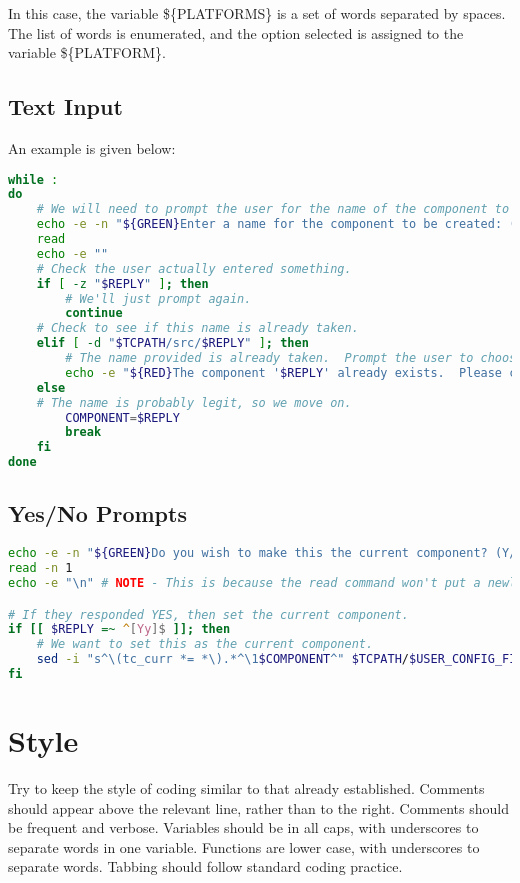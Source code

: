 \documentclass[a4paper, oneside, 11pt, titlepage, onecolumn, openright]{report}
\begin{document}
In this case, the variable \$\{PLATFORMS\} is a set of words separated by spaces. The list of words is enumerated, and the option selected is assigned to the variable \$\{PLATFORM\}. 

\subsection{Text Input}
			\label{ss:TextInput}
			An example is given below:

\begin{lstlisting}[frame=trBL, breaklines=true, language = bash]		
while :
do
	# We will need to prompt the user for the name of the component to create.
	echo -e -n "${GREEN}Enter a name for the component to be created: (No spaces) ${NO_COLOUR}"
	read
	echo -e "" 
	# Check the user actually entered something.
	if [ -z "$REPLY" ]; then
		# We'll just prompt again.
		continue
	# Check to see if this name is already taken.
	elif [ -d "$TCPATH/src/$REPLY" ]; then
		# The name provided is already taken.  Prompt the user to choose an available name.
		echo -e "${RED}The component '$REPLY' already exists.  Please choose another name.\n${NO_COLOUR}"
	else
	# The name is probably legit, so we move on.
		COMPONENT=$REPLY
		break
	fi
done
\end{lstlisting}

\subsection{Yes/No Prompts}
			\label{ss:YNPrompts}
			
\begin{lstlisting}[frame=trBL, breaklines=true, language = bash]
echo -e -n "${GREEN}Do you wish to make this the current component? (Y/N)${NO_COLOUR}"
read -n 1
echo -e "\n" # NOTE - This is because the read command won't put a newline after it reads a character.	

# If they responded YES, then set the current component.	
if [[ $REPLY =~ ^[Yy]$ ]]; then
	# We want to set this as the current component.
	sed -i "s^\(tc_curr *= *\).*^\1$COMPONENT^" $TCPATH/$USER_CONFIG_FILE
fi			
\end{lstlisting}


\section{Style}
			\label{s:Style}
			Try to keep the style of coding similar to that already established. Comments should appear above the relevant line, rather than to the right. Comments should be frequent and verbose.\newline
			Variables should be in all caps, with underscores to separate words in one variable.\newline
			Functions are lower case, with underscores to separate words.\newline
			Tabbing should follow standard coding practice.
\end{document}
